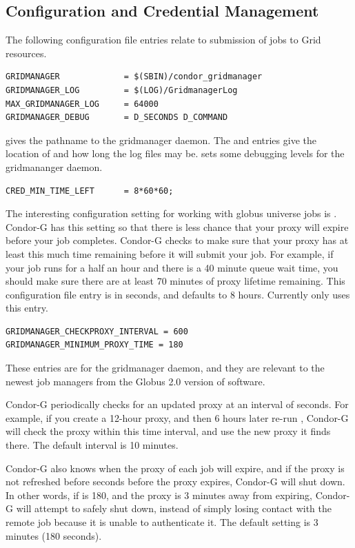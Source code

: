 \subsection{Configuration and Credential Management}

The following configuration file entries relate to submission of
jobs to Grid resources.

\begin{verbatim}
GRIDMANAGER             = $(SBIN)/condor_gridmanager
GRIDMANAGER_LOG         = $(LOG)/GridmanagerLog
MAX_GRIDMANAGER_LOG     = 64000
GRIDMANAGER_DEBUG       = D_SECONDS D_COMMAND
\end{verbatim} 

gives the pathname to the gridmanager daemon.
The 
and
entries give the location of and how long
the log files may be.
sets some debugging levels for the gridmananger daemon.


\begin{verbatim}
CRED_MIN_TIME_LEFT      = 8*60*60;
\end{verbatim} 
The interesting configuration setting for working with globus universe
jobs is
.
Condor-G has this setting so that there is less chance that your
proxy will expire before your job completes.
Condor-G checks
to make sure that your proxy has at least this
much time remaining
before it will submit your job.
For example, if your job runs for a
half an hour and there is a 40 minute queue wait time,
you should make sure there are
at least 70 minutes of proxy lifetime remaining.
This configuration file entry is in seconds,
and defaults to 8 hours.
Currently only  uses this entry.

\begin{verbatim}
GRIDMANAGER_CHECKPROXY_INTERVAL = 600
GRIDMANAGER_MINIMUM_PROXY_TIME = 180
\end{verbatim} 

These entries are for the gridmanager daemon, and they are relevant to
the newest job managers from the Globus 2.0 version of software.

Condor-G periodically checks for an updated proxy at
an interval of
seconds.
For example, if you create a 12-hour proxy, and then
6 hours later re-run ,
Condor-G will check the proxy within
this time interval, and use the new proxy it finds there.
The default interval is 10 minutes.

Condor-G also knows when the proxy of each job will expire,
and if the proxy is not refreshed before
seconds before the proxy expires,
Condor-G will shut down.
In other words, if
is 180, and the proxy is 3 minutes away from
expiring, Condor-G will attempt to safely shut down,
instead of simply losing
contact with the remote job because it is unable to authenticate it.
The default setting is 3 minutes (180 seconds).

